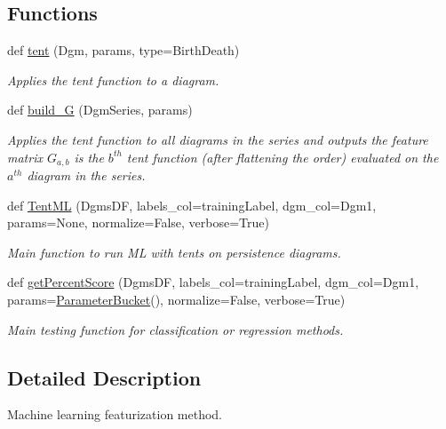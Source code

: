 \subsection*{Functions}
\begin{DoxyCompactItemize}
\item
def \hyperlink{namespaceteaspoon_1_1_m_l_1_1tents_a6a7e3aad0e7229895aa9f204df7e6304}{tent} (Dgm, params, type=\textquotesingle{}Birth\+Death\textquotesingle{})
\begin{DoxyCompactList}\small\item\em Applies the tent function to a diagram. \end{DoxyCompactList}\item
def \hyperlink{namespaceteaspoon_1_1_m_l_1_1tents_a2a752f63d55c359140dc7dbbf8fc9b45}{build\+\_\+G} (Dgm\+Series, params)
\begin{DoxyCompactList}\small\item\em Applies the tent function to all diagrams in the series and outputs the feature matrix $G_{a,b}$ is the $b^{th}$ tent function (after flattening the order) evaluated on the $a^{th}$ diagram in the series. \end{DoxyCompactList}\item
def \hyperlink{namespaceteaspoon_1_1_m_l_1_1tents_a44f03361919ae7223766344ad9f620df}{Tent\+ML} (Dgms\+DF, labels\+\_\+col=\textquotesingle{}training\+Label\textquotesingle{}, dgm\+\_\+col=\textquotesingle{}Dgm1\textquotesingle{}, params=None, normalize=False, verbose=True)
\begin{DoxyCompactList}\small\item\em Main function to run ML with tents on persistence diagrams. \end{DoxyCompactList}\item
def \hyperlink{namespaceteaspoon_1_1_m_l_1_1tents_a227e874560c3fe1181643b41f65dc92c}{get\+Percent\+Score} (Dgms\+DF, labels\+\_\+col=\textquotesingle{}training\+Label\textquotesingle{}, dgm\+\_\+col=\textquotesingle{}Dgm1\textquotesingle{}, params=\hyperlink{classteaspoon_1_1_m_l_1_1tents_1_1_parameter_bucket}{Parameter\+Bucket}(), normalize=False, verbose=True)
\begin{DoxyCompactList}\small\item\em Main testing function for classification or regression methods. \end{DoxyCompactList}\end{DoxyCompactItemize}


\subsection{Detailed Description}
Machine learning featurization method.

